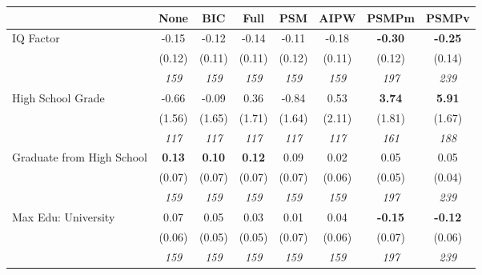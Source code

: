 \begin{tabular}{l c c c c c c c}
\toprule
 & None & BIC & Full & PSM & AIPW & PSMPm & PSMPv \\
\midrule
IQ Factor & -0.15 & -0.12 & -0.14 & -0.11 & -0.18 & \textbf{-0.30} & \textbf{-0.25} \\
& (0.12) & (0.11) & (0.11) & (0.12) & (0.11) & (0.12) & (0.14) \\
& \textit{ 159 } & \textit{ 159 } & \textit{ 159 } & \textit{ 159 } & \textit{ 159 } & \textit{ 197 } & \textit{ 239 } \\
High School Grade & -0.66 & -0.09 & 0.36 & -0.84 & 0.53 & \textbf{3.74} & \textbf{5.91} \\
& (1.56) & (1.65) & (1.71) & (1.64) & (2.11) & (1.81) & (1.67) \\
& \textit{ 117 } & \textit{ 117 } & \textit{ 117 } & \textit{ 117 } & \textit{ 117 } & \textit{ 161 } & \textit{ 188 } \\
Graduate from High School & \textbf{ 0.13 } & \textbf{ 0.10 } & \textbf{ 0.12 } & 0.09 & 0.02 & 0.05 & 0.05 \\
& (0.07) & (0.07) & (0.07) & (0.07) & (0.06) & (0.05) & (0.04) \\
& \textit{ 159 } & \textit{ 159 } & \textit{ 159 } & \textit{ 159 } & \textit{ 159 } & \textit{ 197 } & \textit{ 239 } \\
Max Edu: University & 0.07 & 0.05 & 0.03 & 0.01 & 0.04 & \textbf{-0.15} & \textbf{-0.12} \\
& (0.06) & (0.05) & (0.05) & (0.07) & (0.06) & (0.07) & (0.06) \\
& \textit{ 159 } & \textit{ 159 } & \textit{ 159 } & \textit{ 159 } & \textit{ 159 } & \textit{ 197 } & \textit{ 239 } \\
\bottomrule
\end{tabular}
